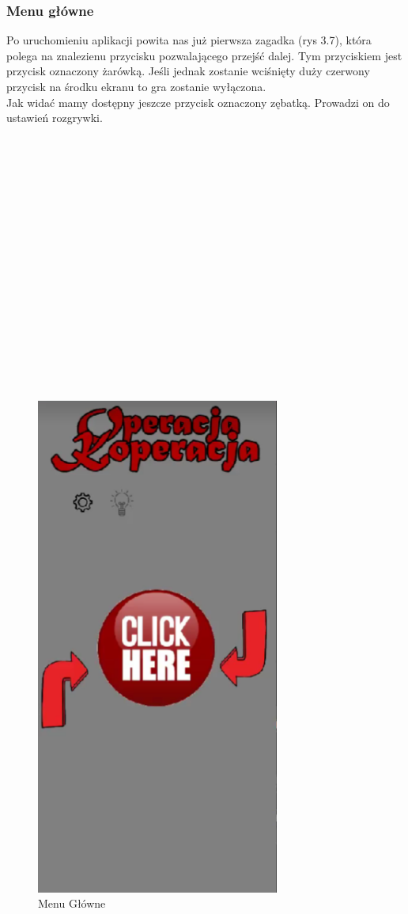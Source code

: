 \subsubsection{Menu główne}
Po uruchomieniu aplikacji powita nas już pierwsza zagadka (rys 3.7), która polega na znalezienu przycisku pozwalającego przejść dalej. Tym przyciskiem jest przycisk oznaczony żarówką. Jeśli jednak zostanie wciśnięty duży czerwony przycisk na środku ekranu to gra zostanie wyłączona. 
\\Jak widać mamy dostępny jeszcze przycisk oznaczony zębatką. Prowadzi on do ustawień rozgrywki.
\\
\\
\\
\\
\\
\\
\\
\\
\\
\\
\\
\\
\\
\\
\\
\\
\\
\\
	\begin{figure}[!htb]
	\begin{center}
		\includegraphics[width=8cm]{rys/menu1.png}
		\caption{Menu Główne}
		\label{rys:rysunek001}
	\end{center}
\end{figure}

